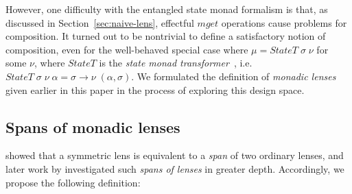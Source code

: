 \documentclass[runningheads]{llncs}
\newcommand{\Conid}[1]{\mathit{#1}}
\newcommand{\Varid}[1]{\mathit{#1}}
\begin{document}
However, one difficulty with the entangled state monad formalism is
that, as discussed in Section~\ref{sec:naive-lens}, effectful
\ensuremath{\Varid{mget}} operations cause problems for composition.  It turned out to be nontrivial
to define a satisfactory notion of composition, even for the well-behaved
special case where \ensuremath{\mu\mathrel{=}\Conid{StateT}\;\sigma\;\nu} for some \ensuremath{\nu}, where \ensuremath{\Conid{StateT}} is
the \emph{state monad transformer}~\citep{liang95popl}, i.e. \ensuremath{\Conid{StateT}\;\sigma\;\nu\;\alpha\mathrel{=}\sigma\to \nu\;(\alpha,\sigma)}.
We formulated the definition of \emph{monadic lenses} given earlier in
this paper in the process of exploring this design space.







\subsection{Spans of monadic lenses}

\citet{symlens} showed that a symmetric lens is
equivalent to a \emph{span} of two ordinary lenses, and later work by
\citet{johnson14bx} investigated such \emph{spans
  of lenses} in greater depth.  Accordingly, we propose the following
definition:
\end{document}
